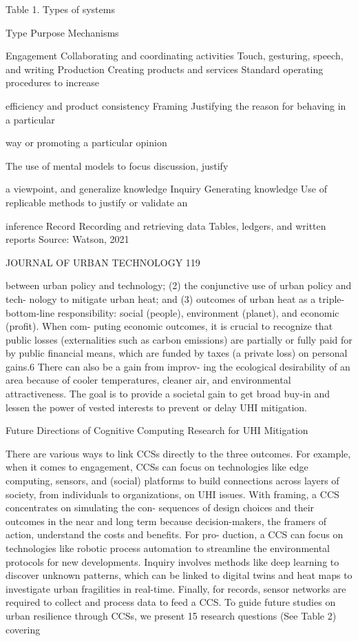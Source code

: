 \documentclass[10pt,a4paper]{article}
\begin{document}
Table 1. Types of systems

Type Purpose Mechanisms

Engagement Collaborating and coordinating activities Touch, gesturing, speech, and writing Production Creating products and services Standard operating procedures to increase

eﬃciency and product consistency Framing Justifying the reason for behaving in a particular

way or promoting a particular opinion

The use of mental models to focus discussion, justify

a viewpoint, and generalize knowledge Inquiry Generating knowledge Use of replicable methods to justify or validate an

inference Record Recording and retrieving data Tables, ledgers, and written reports Source: Watson, 2021

JOURNAL OF URBAN TECHNOLOGY 119

between urban policy and technology; (2) the conjunctive use of urban policy and tech- nology to mitigate urban heat; and (3) outcomes of urban heat as a triple-bottom-line responsibility: social (people), environment (planet), and economic (proﬁt). When com- puting economic outcomes, it is crucial to recognize that public losses (externalities such as carbon emissions) are partially or fully paid for by public ﬁnancial means, which are funded by taxes (a private loss) on personal gains.6 There can also be a gain from improv- ing the ecological desirability of an area because of cooler temperatures, cleaner air, and environmental attractiveness. The goal is to provide a societal gain to get broad buy-in and lessen the power of vested interests to prevent or delay UHI mitigation.

Future Directions of Cognitive Computing Research for UHI Mitigation

There are various ways to link CCSs directly to the three outcomes. For example, when it comes to engagement, CCSs can focus on technologies like edge computing, sensors, and (social) platforms to build connections across layers of society, from individuals to organizations, on UHI issues. With framing, a CCS concentrates on simulating the con- sequences of design choices and their outcomes in the near and long term because decision-makers, the framers of action, understand the costs and beneﬁts. For pro- duction, a CCS can focus on technologies like robotic process automation to streamline the environmental protocols for new developments. Inquiry involves methods like deep learning to discover unknown patterns, which can be linked to digital twins and heat maps to investigate urban fragilities in real-time. Finally, for records, sensor networks are required to collect and process data to feed a CCS. To guide future studies on urban resilience through CCSs, we present 15 research questions (See Table 2) covering
\end{document}
